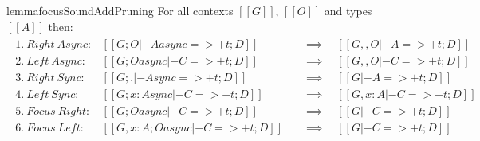 \begin{restatable}{lemma}{focusSoundAddPruning}
For all contexts $[[ G ]]$, $[[ O ]]$ and types $[[ A ]]$
then:
\begin{align*}
\begin{array}{lll}
 1.\ Right\ Async: & [[ G ; O |- A async =>+ t ; D ]] \quad &\implies \quad [[ G ,, O |- A =>+ t ; D ]]\\
 2.\ Left\ Async: & [[ G ; O async |- C =>+ t ; D ]] \quad &\implies \quad [[ G ,, O |- C =>+ t ; D ]]\\
 3.\ Right\ Sync: & [[ G ; . |- A sync =>+ t ; D ]] \quad &\implies \quad [[ G |- A =>+ t ; D ]]\\
 4.\ Left\ Sync: & [[ G ; {x : A }sync |- C =>+ t ; D ]] \quad &\implies \quad [[ G, x : A |- C =>+ t ; D ]]\\
 5.\ Focus\ Right: & [[ G ; O async |- C =>+ t ; D ]] \quad &\implies \quad [[ G |- C =>+ t ; D ]]\\
 6.\ Focus\ Left: & [[ G, x : A ; O async |- C =>+ t ; D ]] \quad &\implies \quad [[ G |- C =>+ t ; D ]]
\end{array}
\end{align*}
\end{restatable}
